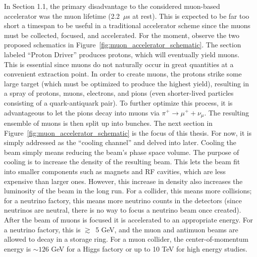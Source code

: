 In Section 1.1, the primary disadvantage to the considered muon-based accelerator was the muon lifetime (2.2~$\mu$s at rest). This is expected to be far too short a timespan to be useful in a traditional accelerator scheme since the muons must be collected, focused, and accelerated. For the moment, observe the two proposed schematics in Figure~\ref{fig:muon_accelerator_schematic}\cite{map}. The section labeled ``Proton Driver'' produces protons, which will eventually yield muons. This is essential since muons do not naturally occur in great quantities at a convenient extraction point. In order to create muons, the protons strike some large target (which must be optimized to produce the highest yield), resulting in a spray of protons, muons, electrons, and pions (even shorter-lived particles consisting of a quark-antiquark pair). To further optimize this process, it is advantageous to let the pions decay into muons via $\pi^+ \rightarrow \mu^+ + \nu_\mu$. The resulting ensemble of muons is then split up into bunches. The next section in Figure~\ref{fig:muon_accelerator_schematic} is the focus of this thesis. For now, it is simply addressed as the ``cooling channel'' and delved into later. Cooling the beam simply means reducing the beam's phase space volume. The purpose of cooling is to increase the density of the resulting beam. This lets the beam fit into smaller components such as magnets and RF cavities, which are less expensive than larger ones. However, this increase in density also increases the luminosity of the beam in the long run. For a collider, this means more collisions; for a neutrino factory, this means more neutrino counts in the detectors (since neutrinos are neutral, there is no way to focus a neutrino beam once created). After the beam of muons is focused it is accelerated to an appropriate energy. For a neutrino factory, this is $\gtrsim$~5 GeV, and the muon and antimuon beams are allowed to decay in a storage ring. For a muon collider, the center-of-momentum energy is $\sim 126$ GeV for a Higgs factory or up to 10 TeV for high energy studies.

